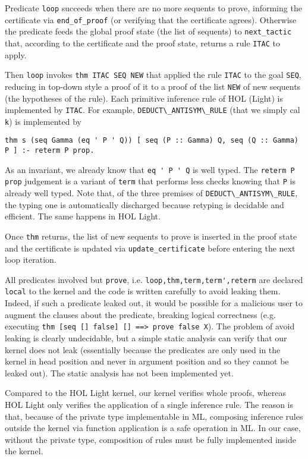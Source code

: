 \documentclass[preprint]{sigplanconf}
\begin{document}
Predicate \verb+loop+ succeeds when there are no more sequents to prove, informing the certificate via \verb+end_of_proof+ (or verifying that the certificate agrees). Otherwise the predicate feeds the global proof state (the list of sequents) to \verb+next_tactic+ that, according to the certificate and the proof state, returns a rule \verb+ITAC+ to apply.

Then \verb+loop+ invokes \verb+thm ITAC SEQ NEW+ that applied the rule \verb+ITAC+ to the goal \verb+SEQ+, reducing in top-down style a proof of it to a proof of the list \verb+NEW+ of new sequents (the hypotheses of the rule). Each primitive inference rule of HOL (Light) is implemented by \verb+ITAC+. For example, \verb+DEDUCT\_ANTISYM\_RULE+ (that we simply cal \verb+k+) is implemented by

\verb+thm s (seq Gamma (eq ' P ' Q)) [ seq (P :: Gamma) Q, seq (Q :: Gamma) P ] :- reterm P prop.+

As an invariant, we already know that \verb+eq ' P ' Q+ is well typed. The \verb+reterm P prop+ judgement is a variant of \verb+term+ that performs less checks knowing that \verb+P+ is already well typed. Note that, of the three premises of \verb+DEDUCT\_ANTISYM\_RULE+, the typing one is automatically discharged because retyping is decidable and efficient. The same happens in HOL Light.

Once \verb+thm+ returns, the list of new sequents to prove is inserted in the
proof state and the certificate is updated via \verb+update_certificate+ before entering the next loop iteration.

All predicates involved but \verb+prove+, i.e. \verb+loop,thm,term,term',reterm+ are declared \verb+local+ to the kernel and the code is written carefully to avoid leaking them. Indeed, if such a predicate leaked out, it would be possible for a malicious user to augment the clauses about the predicate, breaking logical correctness (e.g. executing \verb+thm [seq [] false] [] ==> prove false X+). The problem of avoid leaking is clearly undecidable, but a simple static analysis can verify that our kernel does not leak (essentially because the predicates are only used in the kernel in head position and never in argument position and so they cannot be leaked out). The static analysis has not been implemented yet.

Compared to the HOL Light kernel, our kernel verifies whole proofs, whereas HOL Light only verifies the application of a single inference rule. The reason is that, because of the private type implementable in ML, composing inference rules outside the kernel via function application is a safe operation in ML. In our case, without the private type, composition of rules must be fully implemented inside the kernel.
\end{document}
